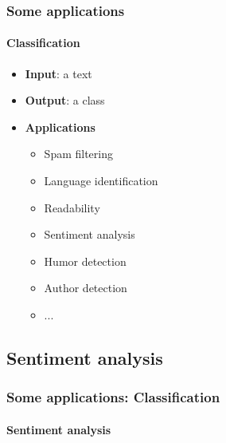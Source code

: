 \documentclass[xcolor=table]{beamer}
\begin{document}
\begin{frame}
	\frametitle{Some applications}
	\framesubtitle{Classification}
	
	\begin{itemize}
		\item \textbf{Input}: a text
		\item \textbf{Output}: a class
		\item \textbf{Applications} 
		\begin{itemize}
			\item Spam filtering
			\item Language identification
			\item Readability
			\item Sentiment analysis
			\item Humor detection
			\item Author detection
			\item ...
		\end{itemize}
	\end{itemize}

\end{frame}

\subsection{Sentiment analysis}

\begin{frame}
	\frametitle{Some applications: Classification}
	\framesubtitle{Sentiment analysis}
\end{frame}
\end{document}
